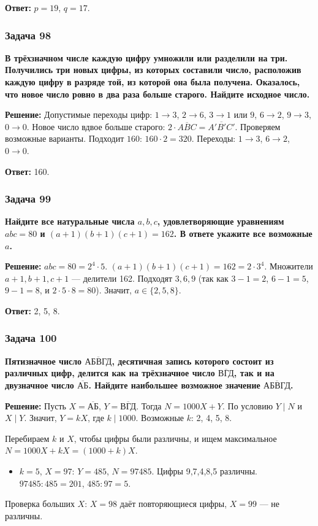 \documentclass[12pt, a4paper]{article}
\begin{document}
\textbf{Ответ:} $p = 19$, $q = 17$.

\subsubsection*{Задача 98}
\textbf{В трёхзначном числе каждую цифру умножили или разделили на три. Получились три новых цифры, из которых составили число, расположив каждую цифру в разряде той, из которой она была получена. Оказалось, что новое число ровно в два раза больше старого. Найдите исходное число.}

\textbf{Решение:}
Допустимые переходы цифр: $1 \to 3$, $2 \to 6$, $3 \to 1$ или $9$, $6 \to 2$, $9 \to 3$, $0 \to 0$.
Новое число вдвое больше старого: $2 \cdot \overline{ABC} = \overline{A'B'C'}$.
Проверяем возможные варианты. Подходит $160$: $160 \cdot 2 = 320$. Переходы: $1 \to 3$, $6 \to 2$, $0 \to 0$.

\textbf{Ответ:} 160.

\subsubsection*{Задача 99}
\textbf{Найдите все натуральные числа $a, b, c$, удовлетворяющие уравнениям $abc = 80$ и $(a+1)(b+1)(c+1) = 162$. В ответе укажите все возможные $a$.}

\textbf{Решение:}
$abc = 80 = 2^4 \cdot 5$. $(a+1)(b+1)(c+1) = 162 = 2 \cdot 3^4$. Множители $a+1, b+1, c+1$ — делители 162. Подходят $3, 6, 9$ (так как $3-1=2$, $6-1=5$, $9-1=8$, и $2 \cdot 5 \cdot 8 = 80$). Значит, $a \in \{2, 5, 8\}$.

\textbf{Ответ:} 2, 5, 8.

\subsubsection*{Задача 100}
\textbf{Пятизначное число $\overline{\text{АБВГД}}$, десятичная запись которого состоит из различных цифр, делится как на трёхзначное число $\overline{\text{ВГД}}$, так и на двузначное число $\overline{\text{АБ}}$. Найдите наибольшее возможное значение $\overline{\text{АБВГД}}$.}

\textbf{Решение:}
Пусть $X = \overline{\text{АБ}}$, $Y = \overline{\text{ВГД}}$. Тогда $N = 1000X + Y$. По условию $Y \mid N$ и $X \mid Y$. Значит, $Y = kX$, где $k \mid 1000$. Возможные $k$: 2, 4, 5, 8.

Перебираем $k$ и $X$, чтобы цифры были различны, и ищем максимальное $N = 1000X + kX = (1000+k)X$.
\begin{itemize}
    \item $k=5$, $X=97$: $Y = 485$, $N = 97485$. Цифры 9,7,4,8,5 различны. $97485 : 485 = 201$, $485 : 97 = 5$.
\end{itemize}
Проверка больших $X$: $X=98$ даёт повторяющиеся цифры, $X=99$ — не различны.
\end{document}
